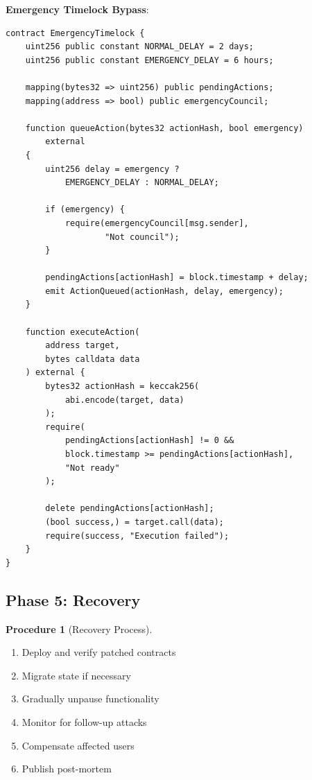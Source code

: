 \documentclass[11pt,a4paper]{article}
\theoremstyle{definition}
\newtheorem{procedure}{Procedure}
\begin{document}
\textbf{Emergency Timelock Bypass}:
\begin{lstlisting}[language=Solidity,basicstyle=\ttfamily\small]
contract EmergencyTimelock {
    uint256 public constant NORMAL_DELAY = 2 days;
    uint256 public constant EMERGENCY_DELAY = 6 hours;

    mapping(bytes32 => uint256) public pendingActions;
    mapping(address => bool) public emergencyCouncil;

    function queueAction(bytes32 actionHash, bool emergency)
        external
    {
        uint256 delay = emergency ?
            EMERGENCY_DELAY : NORMAL_DELAY;

        if (emergency) {
            require(emergencyCouncil[msg.sender],
                    "Not council");
        }

        pendingActions[actionHash] = block.timestamp + delay;
        emit ActionQueued(actionHash, delay, emergency);
    }

    function executeAction(
        address target,
        bytes calldata data
    ) external {
        bytes32 actionHash = keccak256(
            abi.encode(target, data)
        );
        require(
            pendingActions[actionHash] != 0 &&
            block.timestamp >= pendingActions[actionHash],
            "Not ready"
        );

        delete pendingActions[actionHash];
        (bool success,) = target.call(data);
        require(success, "Execution failed");
    }
}
\end{lstlisting}

\subsection{Phase 5: Recovery}

\begin{procedure}[Recovery Process]
\begin{enumerate}
    \item Deploy and verify patched contracts
    \item Migrate state if necessary
    \item Gradually unpause functionality
    \item Monitor for follow-up attacks
    \item Compensate affected users
    \item Publish post-mortem
\end{enumerate}
\end{procedure}
\end{document}
